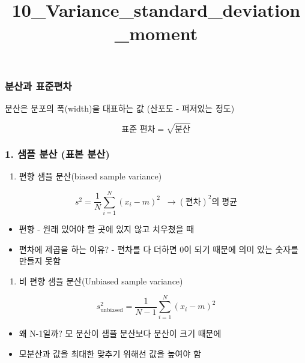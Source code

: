 \documentclass[11pt]{article}
\title{10\_Variance\_standard\_deviation\_moment}
\providecommand{\tightlist}{%
      \setlength{\itemsep}{0pt}\setlength{\parskip}{0pt}}
\begin{document}
    
    
    \maketitle
    
    

    
    \hypertarget{uxbd84uxc0b0uxacfc-uxd45cuxc900uxd3b8uxcc28}{%
\subsubsection{분산과
표준편차}\label{uxbd84uxc0b0uxacfc-uxd45cuxc900uxd3b8uxcc28}}

    분산은 분포의 폭(width)을 대표하는 값 (산포도 - 퍼져있는 정도)

    \[ \text{표준 편차} = \sqrt{\text{분산}} \]

    \hypertarget{uxc0d8uxd50c-uxbd84uxc0b0-uxd45cuxbcf8-uxbd84uxc0b0}{%
\subsubsection{1. 샘플 분산 (표본
분산)}\label{uxc0d8uxd50c-uxbd84uxc0b0-uxd45cuxbcf8-uxbd84uxc0b0}}

    \begin{enumerate}
\def\labelenumi{\arabic{enumi})}
\tightlist
\item
  편향 샘플 분산(biased sample variance)
\end{enumerate}

    \[ s^2 = \dfrac{1}{N}\sum_{i=1}^{N} (x_i-m)^2\;\;\rightarrow (편차)^2의\;평균 \]

    \begin{itemize}
\tightlist
\item
  편향 - 원래 있어야 할 곳에 있지 않고 치우쳤을 때
\item
  편차에 제곱을 하는 이유? - 편차를 다 더하면 0이 되기 때문에 의미 있는
  숫자를 만들지 못함
\end{itemize}

    \begin{enumerate}
\def\labelenumi{\arabic{enumi})}
\setcounter{enumi}{1}
\tightlist
\item
  비 편향 샘플 분산(Unbiased sample variance)
\end{enumerate}

    \[ s^2_{\text{unbiased}} = \dfrac{1}{N-1}\sum_{i=1}^{N} (x_i-m)^2 \]

    \begin{itemize}
\tightlist
\item
  왜 N-1일까? 모 분산이 샘플 분산보다 분산이 크기 때문에
\item
  모분산과 값을 최대한 맞추기 위해선 값을 높여야 함
\end{itemize}
\end{document}
